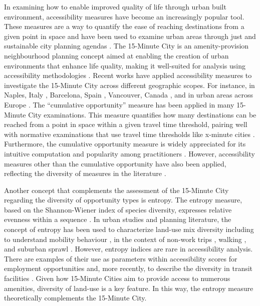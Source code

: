\documentclass[
  authoryear,
  preprint,
  3p]{elsarticle}
\begin{document}
In examining how to enable improved quality of life through urban built
environment, accessibility measures have become an increasingly popular
tool. These measures are a way to quantify the ease of reaching
destinations from a given point in space and have been used to examine
urban areas through just and sustainable city planning agendas
\citep{vale2023accessibility, handyAccessibilityIdeaWhose2020}. The
15-Minute City is an amenity-provision neighbourhood planning concept
aimed at enabling the creation of urban environments that enhance life
quality, making it well-suited for analysis using accessibility
methodologies \citep{guzmanProximityEnoughCritical2024}. Recent works
have applied accessibility measures to investigate the 15-Minute City
across different geographic scopes. For instance, in Naples, Italy
\citep{gaglioneUrbanAccessibility15minute2022}, Barcelona, Spain
\citep{graellsCityCitiesMeasuring2021}, Vancouver, Canada
\citep{hosford15minuteCityReach2022}, and in urban areas across Europe
\citep{vale2023accessibility}. The ``cumulative opportunity'' measure
has been applied in many 15-Minute City examinations. This measure
quantifies how many destinations can be reached from a point in space
within a given travel time threshold, pairing well with normative
examinations \citep[see][]{paez_measuring_2012} that use travel time
thresholds like x-minute cities \citep{logan_xminute_2022}. Furthermore,
the cumulative opportunity measure is widely appreciated for its
intuitive computation and popularity among practitioners
\citep{handyAccessibilityIdeaWhose2020, handyMeasuringAccessibilityExploration1997, chengInvestigatingWalkingAccessibility2019}.
However, accessibility measures other than the cumulative opportunity
have also been applied, reflecting the diversity of measures in the
literature \citep{guzmanProximityEnoughCritical2024}.

Another concept that complements the assessment of the 15-Minute City
regarding the diversity of opportunity types is entropy. The entropy
measure, based on the Shannon-Wiener index of species diversity,
expresses relative evenness within a sequence
\citep{whittaker1972evolution}. In urban studies and planning
literature, the concept of entropy has been used to characterize
land-use mix diversity
\citep{frankLinkingObjectivelyMeasured2005, ewingTravelBuiltEnvironment2010a, moniruzzaman_accessibility_2012}
including to understand mobility behaviour
\citep{mcbride2020exploration, montero2023applying, montero2023role}, in
the context of non-work trips \citep{cerveroTravelDemand3Ds1997},
walking
\citep{luUrbanDensityDiversity2017, mavoaIdentifyingAppropriateLanduse2018},
and suburban sprawl \citep{randallGISBasedLand2015}. However, entropy
indices are rare in accessibility analysis. There are examples of their
use as parameters within accessibility scores for employment
opportunities
\citep{chengMeasuringUrbanJob2013, daiIncorporatingJobDiversity2018}
and, more recently, to describe the diversity in transit facilities
\citep{yinIncorporatingFacilityDiversity2024}. Given how 15-Minute
Cities aim to provide access to numerous amenities, diversity of
land-use is a key feature. In this way, the entropy measure
theoretically complements the 15-Minute City.
\end{document}
